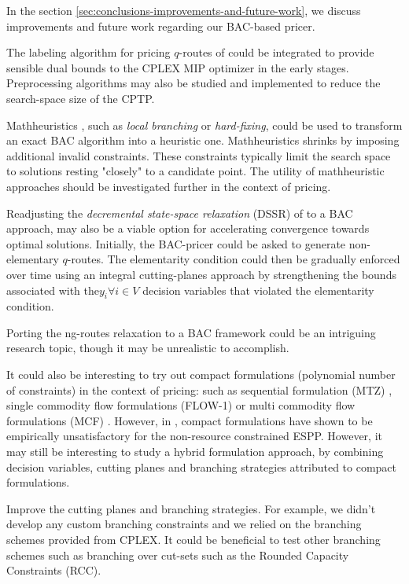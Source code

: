 In the section \cref{sec:conclusions-improvements-and-future-work}, we discuss improvements and future work regarding our BAC-based pricer.

The labeling algorithm for pricing $q$-routes of \textcite{desrochers1992} could be integrated to provide sensible dual bounds to the CPLEX MIP optimizer in the early stages.
Preprocessing algorithms may also be studied and implemented to reduce the search-space size of the CPTP.

Mathheuristics \parencite{fischetti2018}, such as \textit{local branching} \parencite{fischetti2003} or \textit{hard-fixing}, could be used to transform an exact BAC algorithm into a heuristic one.
Mathheuristics shrinks by imposing additional invalid constraints.
These constraints typically limit the search space to solutions resting "closely" to a candidate point.
The utility of mathheuristic approaches should be investigated further in the context of pricing.

Readjusting the \textit{decremental state-space relaxation} (DSSR) of \textcite{boland2006, righini2008, martinelli2014} to a BAC approach, may also be a viable option for accelerating convergence towards optimal solutions.
Initially, the BAC-pricer could be asked to generate non-elementary $q$-routes.
The elementarity condition could then be gradually enforced over time using an integral cutting-planes approach by strengthening the bounds associated with the$y_i \forall i \in V$ decision variables that violated the elementarity condition.

Porting the ng-routes relaxation \parencite{baldacci2011} to a BAC framework could be an intriguing research topic, though it may be unrealistic to accomplish.



It could also be interesting to try out compact formulations (polynomial number of constraints) in the context of pricing: such as sequential formulation (MTZ) \parencite{miller1960}, single commodity flow formulations (FLOW-1) \parencite{gavish1978travelling} or multi commodity flow formulations (MCF) \parencite{wong1980integer,claus1984new}.
However, in \textcite{taccari2016}, compact formulations have shown to be empirically unsatisfactory for the non-resource constrained ESPP.
However, it may still be interesting to study a hybrid formulation approach, by combining decision variables, cutting planes and branching strategies attributed to compact formulations.

Improve the cutting planes and branching strategies.
For example, we didn't develop any custom branching constraints and we relied on the branching schemes provided from CPLEX.
It could be beneficial to test other branching schemes such as branching over cut-sets such as the Rounded Capacity Constraints (RCC).

